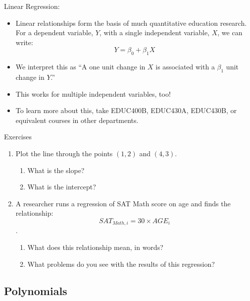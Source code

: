 \documentclass[]{beamer}
\begin{document}
    \begin{frame}{Linear Regression:}
        \begin{itemize}
              \item<2-> Linear relationships form the basis of much quantitative education research. For a dependent variable, $Y$, with a single independent variable, $X$, we can write:
    $$ Y = \beta_0 + \beta_1 X$$
              \item<3-> We interpret this as ``A one unit change in $X$ is associated with a $\beta_1$ unit change in $Y$.''
              \item<4-> This works for multiple independent variables, too!
              \item<5-> To learn more about this, take EDUC400B, EDUC430A, EDUC430B, or equivalent courses in other departments.
        \end{itemize}
    \end{frame}

    \begin{frame}{Exercises}
        \begin{enumerate}
            \item Plot the line through the points $(1,2)$ and $(4,3)$. 
            \begin{enumerate}
                \item What is the slope? 
                \item What is the intercept?
            \end{enumerate}
            \item A researcher runs a regression of SAT Math score on age and finds the relationship: $$SAT_{Math,i} = 30 \times AGE_i$$.
            \begin{enumerate}
                \item What does this relationship mean, in words?
                \item What problems do you see with the results of this regression?
            \end{enumerate}
        \end{enumerate}
    \end{frame}

    \subsection{Polynomials}
\end{document}
